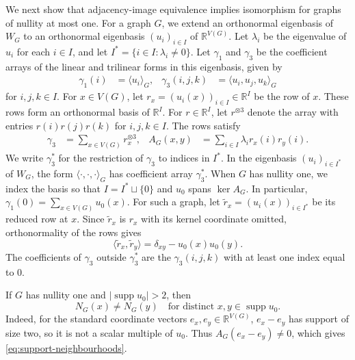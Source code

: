 \documentclass[10pt,a4paper]{article}
\theoremstyle{plain}
\theoremstyle{definition}
\DeclareMathOperator{\supp}{supp}
\newcommand{\R}{\mathbb{R}}
\begin{document}
We next show that adjacency-image equivalence implies isomorphism for
graphs of nullity at most one.
For a graph $G$, we extend an orthonormal eigenbasis of $W_G$ to an
orthonormal eigenbasis $(u_i)_{i\in I}$ of $\R^{V(G)}$.
Let $\lambda_i$ be the eigenvalue of $u_i$ for each $i\in I$,
and let $I^{*}=\{i\in I:\lambda_i\ne0\}$.
Let $\gamma_1$ and $\gamma_3$ be the coefficient arrays of the
linear and trilinear forms in this eigenbasis, given by
\begin{equation}
  \label{eq:tensors}
  \begin{aligned}
  \gamma_1(i)&=\langle u_i\rangle_G, &
  \gamma_3(i,j,k)&=\langle u_i,u_j,u_k\rangle_G
  \end{aligned}
\end{equation}
for $i,j,k\in I$. For $x\in V(G)$, let $r_x=(u_i(x))_{i\in I}\in\R^I$ be
the row of $x$. These rows form an orthonormal basis of $\R^I$.
For $r\in\R^I$, let $r^{\otimes3}$ denote the array with entries
$r(i)r(j)r(k)$ for $i,j,k\in I$.
The rows satisfy
\begin{equation}
  \label{eq:rows}
  \begin{aligned}
  \gamma_3 &= \sum_{x \in V(G)} r_x^{\otimes 3}, &
  A_G(x,y) &= \sum_{i \in I} \lambda_i r_x(i) r_y(i).
  \end{aligned}
\end{equation}
We write $\gamma_3^{*}$ for the restriction of $\gamma_3$ to
indices in $I^{*}$.
In the eigenbasis $(u_i)_{i\in I^*}$ of $W_G$, the form
$\langle\cdot,\cdot,\cdot\rangle_G$ has coefficient array $\gamma_3^*$.
When $G$ has nullity one, we index the basis so that $I=I^*\sqcup\{0\}$
and $u_0$ spans $\ker A_G$.
In particular, $\gamma_1(0)=\sum_{x\in V(G)}u_0(x)$.
For such a graph, let $\tilde{r}_x=(u_i(x))_{i\in I^*}$ be
its reduced row at $x$.
Since $\tilde{r}_x$ is $r_x$ with its kernel coordinate omitted,
orthonormality of the rows gives
\begin{equation}\label{eq:gram}
 \langle\tilde{r}_x,\tilde{r}_y\rangle=\delta_{xy}-u_0(x)u_0(y).
\end{equation}
The coefficients of $\gamma_3$ outside
$\gamma_3^*$ are the $\gamma_3(i,j,k)$ with at least one
index equal to $0$.

If $G$ has nullity one and $|\supp u_0|>2$, then
\begin{equation}\label{eq:support-neighbourhoods}
 N_G(x)\ne N_G(y)\quad\text{for distinct }x,y\in\supp u_0.
\end{equation}
Indeed, for the standard coordinate vectors $e_x,e_y\in\R^{V(G)}$,
$e_x-e_y$ has support of size two, so it is not a scalar multiple of
$u_0$. Thus $A_G(e_x-e_y)\ne0$, which gives
\cref{eq:support-neighbourhoods}.
\end{document}
